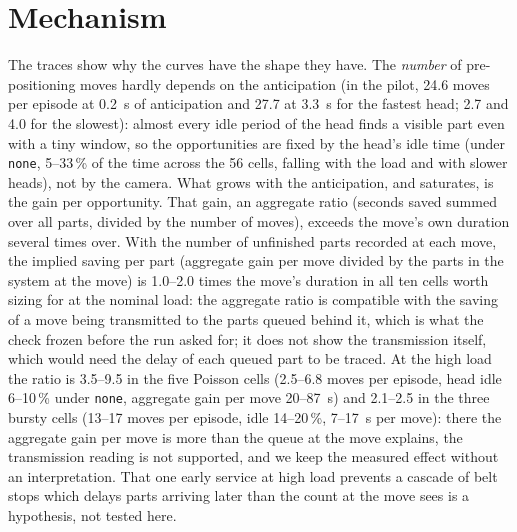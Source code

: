 \documentclass[11pt,a4paper]{article}
\begin{document}

\section{Mechanism}\label{sup:mechanism}
The traces show why the curves have the shape they have. The \emph{number} of
pre-positioning moves hardly depends on the anticipation (in the pilot, 24.6 moves per
episode at 0.2~s of anticipation and 27.7 at 3.3~s for the fastest head; 2.7 and 4.0 for
the slowest): almost every idle period of the head finds a visible part even with a tiny
window, so the opportunities are fixed by the head's idle time (under \texttt{none}, 5--33\,\% of
the time across the 56 cells, falling with the load and with slower heads), not by the
camera. What grows with
the anticipation, and saturates, is the gain per opportunity. That gain, an aggregate
ratio (seconds saved summed over all parts, divided by the number of moves), exceeds the
move's own duration several times over. With the number of unfinished parts recorded at
each move, the implied saving per part (aggregate gain per move divided by the parts in
the system at the move) is 1.0--2.0 times the move's duration in all ten cells worth sizing
for at the nominal load: the aggregate ratio is compatible with the saving of a move being
transmitted to the parts queued behind it, which is what the check frozen before the run asked
for; it does not show the transmission itself, which would need the delay of each queued
part to be traced. At the high load the ratio is 3.5--9.5 in the five Poisson cells (2.5--6.8 moves per
episode, head idle 6--10\,\% under \texttt{none}, aggregate gain per move 20--87~s) and
2.1--2.5 in the three bursty cells (13--17 moves per episode, idle 14--20\,\%, 7--17~s per
move): there the aggregate gain per move is more than the queue at the move explains, the transmission reading is not supported, and we keep the measured
effect without an interpretation. That one early service at high load prevents a cascade
of belt stops which delays parts arriving later than the count at the move sees is a
hypothesis, not tested here.

\end{document}

